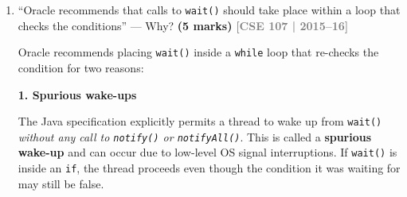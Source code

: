 \documentclass[12pt,a3paper]{article}
\newcommand{\yr}[1]{\hfill\textcolor{gray}{\small\textbf{[#1]}}}
\newcommand{\mk}[1]{\textcolor{orange!70!black}{\small\textbf{(#1 marks)}}}
\begin{document}
\begin{enumerate}
\begin{tcolorbox}
\begin{lstlisting}[language=Java]
    // Safe substitute for suspend()
    public synchronized void safeSuspend() {
        paused = true;
    }

    // Safe substitute for resume()
    public synchronized void safeResume() {
        if (paused) {
            paused = false;
            notify(); // Target execution guard; only signals when thread is paused
        }
    }

    // Safe substitute for stop()
    public void safeStop() {
        active = false;
        safeResume(); // Unblocks the thread immediately if it was parked in wait()
    }
}

public class Main {
    public static void main(String[] args) throws InterruptedException {
        SafeRunnable runnable = new SafeRunnable();
        Thread worker = new Thread(runnable, "WorkerThread");
        worker.start();

        Thread.sleep(600);
        System.out.println("[Main] Suspending thread...");
        runnable.safeSuspend();

        Thread.sleep(1000);
        System.out.println("[Main] Resuming thread...");
        runnable.safeResume();

        Thread.sleep(600);
        System.out.println("[Main] Stopping thread cleanly...");
        runnable.safeStop();
        
        worker.join();
    }
}
\end{lstlisting}

\end{tcolorbox}

\item ``Oracle recommends that calls to \texttt{wait()} should take place within a loop that checks the conditions'' --- Why? \mk{5}
\yr{CSE 107 | 2015--16}

\begin{tcolorbox}[enhanced,breakable,ansbox,
  colback=cF!4,colframe=cF,boxrule=0.8pt,arc=5pt,
  title={\textbf{Answer --- Why \texttt{wait()} Must Be Inside a Loop}},
  fonttitle=\bfseries\color{white},colbacktitle=cF]

Oracle recommends placing \texttt{wait()} inside a \texttt{while}
loop that re-checks the condition for two reasons:

\medskip
\textbf{1. Spurious wake-ups}

The Java specification explicitly permits a thread to wake up from
\texttt{wait()} \emph{without any call to \texttt{notify()} or
\texttt{notifyAll()}}.  This is called a \textbf{spurious wake-up}
and can occur due to low-level OS signal interruptions.  If
\texttt{wait()} is inside an \texttt{if}, the thread proceeds
even though the condition it was waiting for may still be false.


\end{tcolorbox}
\end{enumerate}
\end{document}
